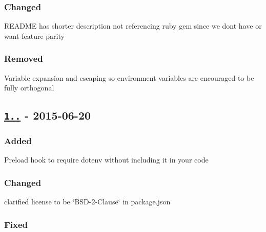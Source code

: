 \subsubsection*{Changed}


\begin{DoxyItemize}
\item R\+E\+A\+D\+ME has shorter description not referencing ruby gem since we don\textquotesingle{}t have or want feature parity
\end{DoxyItemize}

\subsubsection*{Removed}


\begin{DoxyItemize}
\item Variable expansion and escaping so environment variables are encouraged to be fully orthogonal
\end{DoxyItemize}

\subsection*{\href{https://github.com/motdotla/dotenv/compare/v1.1.0...v1.2.0}{\tt 1..} -\/ 2015-\/06-\/20}

\subsubsection*{Added}


\begin{DoxyItemize}
\item Preload hook to require dotenv without including it in your code
\end{DoxyItemize}

\subsubsection*{Changed}


\begin{DoxyItemize}
\item clarified license to be \char`\"{}\+B\+S\+D-\/2-\/\+Clause\char`\"{} in {\ttfamily package.\+json}
\end{DoxyItemize}

\subsubsection*{Fixed}



